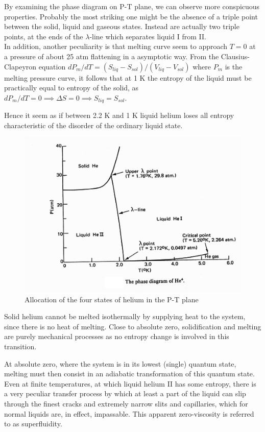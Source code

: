 \documentclass{article}
\begin{document}
By examining the phase diagram on P-T plane, we can observe more conspicuous properties. Probably the most striking one might be the absence of a triple point between the solid, liquid and gaseous states. Instead are actually two triple points, at the ends of the $\lambda$-line which separates liquid  I from  II\@.
\\

In addition, another peculiarity is that melting curve seem to approach $T = 0$ at a pressure of about 25 atm flattening in a asymptotic way. From the Clausius-Clapeyron equation $dP_m / dT =(S_{liq}-S_{sol})/(V_{liq}-V_{sol})$ where $P_m$ is the melting pressure curve, it follows that at 1 K the entropy of the liquid must be practically equal to entropy of the solid, as $dP_m / dT = 0 \implies \Delta S = 0 \implies S_{liq}=S_{sol}$.

Hence it seem as if between 2.2 K and 1 K liquid helium loses all entropy characteristic of the disorder of the ordinary liquid state.
\\

\begin{figure}[H]
    \centering
    \includegraphics[width=0.75\linewidth]{Images/PhaseDiagr.png}
    \caption{Allocation of the four states of helium in the P-T plane}
    \label{fig:enter-label}
\end{figure}

Solid helium cannot be melted isothermally by supplying heat to the system, since there is no heat of melting. Close to absolute zero, solidification and melting are purely mechanical processes as no entropy change is involved in this transition.

At absolute zero, where the system is in its lowest (single) quantum state, melting must then consist in an adiabatic transformation of this quantum state. Even at finite temperatures, at which liquid helium II has some entropy, there is a very peculiar transfer process by which at least a part of the liquid can slip through the finest cracks and extremely narrow slits and capillaries, which for normal liquids are, in effect, impassable. This apparent zero-viscosity is referred to as superfluidity.
\\
\end{document}
